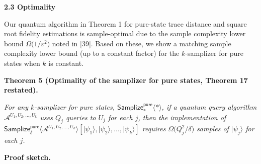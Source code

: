 



\par\medskip\noindent\textbf{
2.3 Optimality}\par




Our quantum algorithm in
Theorem 1 for pure-state trace distance and square root fidelity estimations is sample-optimal due to the sample complexity lower bound $\Omega\lparen 1/\varepsilon^{2}\rparen$ noted in [39].
Based on these, we show a matching sample complexity lower bound (up to a constant factor) for the $k$-samplizer for pure states when $k$ is constant.\par





\par\medskip\noindent\textbf{
\textbf{Theorem 5}\textbf{ }(Optimality of the samplizer for pure states, Theorem 17 restated)\textbf{.}
}\par



\emph{For any $k$-samplizer for pure states, $\mathsf{Samplize}^{\mathsf{pure}}_{*}\langle*\rangle$,
if a quantum query algorithm $\mathcal{A}^{U_{1},U_{2},\dots,U_{k}}$ uses $Q_{j}$ queries to $U_{j}$ for each $j$,
then the implementation of $\mathsf{Samplize}^{\mathsf{pure}}_{\delta}\langle\mathcal{A}^{U_{1},U_{2},\dots,U_{k}}\rangle[\lvert\psi_{1}\rangle,\lvert\psi_{2}\rangle,\dots,\lvert\psi_{k}\rangle]$ requires $\Omega\lparen Q_{j}^{2}/\delta\rparen$ samples of $\lvert\psi_{j}\rangle$ for each $j$.}\par






\par\medskip\noindent\textbf{Proof sketch.}\par




